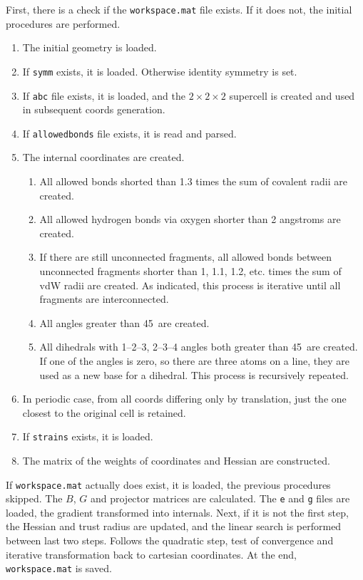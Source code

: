 \documentclass[12pt,a4]{article}
\begin{document}
First, there is a check if the \texttt{workspace.mat} file exists. If it does not, the initial procedures are performed.
\begin{enumerate}
\item The initial geometry is loaded.
\item If \texttt{symm} exists, it is loaded. Otherwise identity symmetry is set.
\item If \texttt{abc} file exists, it is loaded, and the $2\times2\times2$ supercell is created and used in subsequent coords generation.
\item If \texttt{allowedbonds} file exists, it is read and parsed.
\item The internal coordinates are created.
\begin{enumerate}
\item All allowed bonds shorted than 1.3 times the sum of covalent radii are created.
\item All allowed hydrogen bonds via oxygen shorter than 2 angstroms are created.
\item If there are still unconnected fragments, all allowed bonds between unconnected fragments shorter than 1, 1.1, 1.2, etc. times the sum of vdW radii are created. As indicated, this process is iterative until all fragments are interconnected.
\item All angles greater than 45\textdegree\ are created.
\item All dihedrals with 1--2--3, 2--3--4 angles both greater than 45\textdegree\ are created. If one of the angles is zero, so there are three atoms on a line, they are used as a new base for a dihedral. This process is recursively repeated.
\end{enumerate}
\item In periodic case, from all coords differing only by translation, just the one closest to the original cell is retained.
\item If \texttt{strains} exists, it is loaded.
\item The matrix of the weights of coordinates and Hessian are constructed.
\end{enumerate}

If \texttt{workspace.mat} actually does exist, it is loaded, the previous procedures skipped. The $B$, $G$ and projector matrices are calculated. The \texttt{e} and \texttt{g} files are loaded, the gradient transformed into internals. Next, if it is not the first step, the Hessian and trust radius are updated, and the linear search is performed between last two steps. Follows the quadratic step, test of convergence and iterative transformation back to cartesian coordinates. At the end, \texttt{workspace.mat} is saved.
\end{document}

